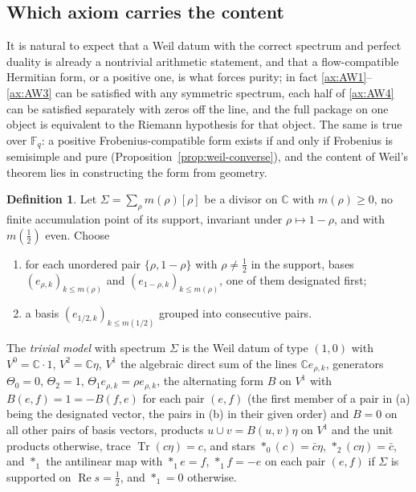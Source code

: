 \documentclass[11pt]{amsart}
\theoremstyle{plain}
\theoremstyle{definition}
\newtheorem{definition}[theorem]{Definition}
\theoremstyle{remark}
\numberwithin{equation}{section}
\newcommand{\C}{\mathbb{C}}
\newcommand{\F}{\mathbb{F}}
\DeclareMathOperator{\Tr}{Tr}
\DeclareMathOperator{\Rea}{Re}
\renewcommand{\Re}{\Rea}
\begin{document}
\subsection{Which axiom carries the content}\label{subsec:content}

It is natural to expect that a Weil datum with the correct spectrum
and perfect duality is already a nontrivial arithmetic statement, and
that a flow-compatible Hermitian form, or a positive one, is what forces
purity; in fact \ref{ax:AW1}--\ref{ax:AW3} can be satisfied with any
symmetric spectrum, each half of \ref{ax:AW4} can be satisfied
separately with zeros off the line, and the full package on one object
is equivalent to the Riemann hypothesis for that object. The same is
true over $\F_q$: a positive Frobenius-compatible form exists if and
only if Frobenius is semisimple and pure
(Proposition~\ref{prop:weil-converse}), and the content of Weil's
theorem lies in constructing the form from geometry.

\begin{definition}\label{def:trivial-model}
Let $\Sigma=\sum_\rho m(\rho)[\rho]$ be a divisor on $\C$ with
$m(\rho)\ge0$, no finite accumulation point of its support, invariant
under $\rho\mapsto1-\rho$, and with $m(\tfrac12)$ even. Choose
\begin{enumerate}[label=(\alph*)]
\item for each unordered pair $\{\rho,1-\rho\}$ with $\rho\ne\tfrac12$
  in the support, bases $(e_{\rho,k})_{k\le m(\rho)}$ and
  $(e_{1-\rho,k})_{k\le m(\rho)}$, one of them designated first;
\item a basis $(e_{1/2,k})_{k\le m(1/2)}$ grouped into consecutive pairs.
\end{enumerate}
The \emph{trivial model} with spectrum $\Sigma$ is the Weil datum of
type $(1,0)$ with $V^0=\C\cdot1$, $V^2=\C\eta$, $V^1$ the algebraic
direct sum of the lines $\C e_{\rho,k}$, generators $\Theta_0=0$,
$\Theta_2=1$, $\Theta_1e_{\rho,k}=\rho e_{\rho,k}$, the alternating form
$B$ on $V^1$ with $B(e,f)=1=-B(f,e)$ for each pair $(e,f)$ (the first
member of a pair in (a) being the designated vector, the pairs in (b)
in their given order) and $B=0$ on all other pairs of basis vectors,
products $u\cup v=B(u,v)\eta$ on $V^1$ and the unit products otherwise,
trace $\Tr(c\eta)=c$, and stars $*_0(c)=\bar c\eta$,
$*_2(c\eta)=\bar c$, and $*_1$ the antilinear map with $*_1e=f$,
$*_1f=-e$ on each pair $(e,f)$ if $\Sigma$ is supported on
$\Re s=\tfrac12$, and $*_1=0$ otherwise.
\end{definition}
\end{document}
